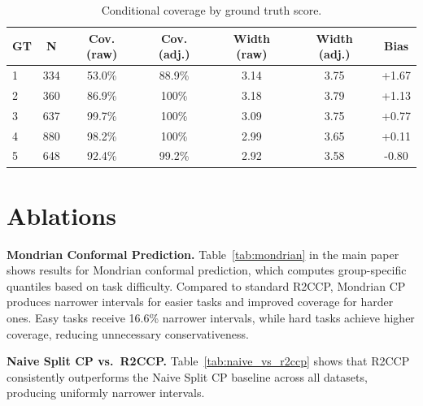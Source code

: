 \documentclass{article}
\begin{document}
\begin{table}[t]
\centering
\caption{Conditional coverage by ground truth score.}
\label{tab:conditional}
\small
\begin{tabular}{lcccccc}
\toprule
\textbf{GT} & \textbf{N} & \textbf{Cov. (raw)} & \textbf{Cov. (adj.)} & \textbf{Width (raw)} & \textbf{Width (adj.)} & \textbf{Bias} \\
\midrule
1 & 334 & 53.0\% & 88.9\% & 3.14 & 3.75 & +1.67 \\
2 & 360 & 86.9\% & 100\% & 3.18 & 3.79 & +1.13 \\
3 & 637 & 99.7\% & 100\% & 3.09 & 3.75 & +0.77 \\
4 & 880 & 98.2\% & 100\% & 2.99 & 3.65 & +0.11 \\
5 & 648 & 92.4\% & 99.2\% & 2.92 & 3.58 & -0.80 \\
\bottomrule
\end{tabular}
\end{table}

\section{Ablations}

\textbf{Mondrian Conformal Prediction.}
Table~\ref{tab:mondrian} in the main paper shows results for Mondrian conformal prediction, which computes group-specific quantiles based on task difficulty. Compared to standard R2CCP, Mondrian CP produces narrower intervals for easier tasks and improved coverage for harder ones. Easy tasks receive 16.6\% narrower intervals, while hard tasks achieve higher coverage, reducing unnecessary conservativeness.

\textbf{Naive Split CP vs.\ R2CCP.}
Table~\ref{tab:naive_vs_r2ccp} shows that R2CCP consistently outperforms the Naive Split CP baseline across all datasets, producing uniformly narrower intervals.
\end{document}
